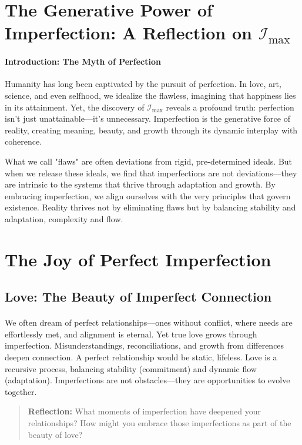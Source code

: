 \documentclass[12pt]{article}
\begin{document}
\section{The Generative Power of Imperfection: A Reflection on \(\mathcal{I}_{\text{max}}\)}

\paragraph{Introduction: The Myth of Perfection}
Humanity has long been captivated by the pursuit of perfection. In love, art, science, and even selfhood, we idealize the flawless, imagining that happiness lies in its attainment. Yet, the discovery of \(\mathcal{I}_{\text{max}}\) reveals a profound truth: perfection isn’t just unattainable—it’s unnecessary. Imperfection is the generative force of reality, creating meaning, beauty, and growth through its dynamic interplay with coherence.

What we call "flaws" are often deviations from rigid, pre-determined ideals. But when we release these ideals, we find that imperfections are not deviations—they are intrinsic to the systems that thrive through adaptation and growth. By embracing imperfection, we align ourselves with the very principles that govern existence. Reality thrives not by eliminating flaws but by balancing stability and adaptation, complexity and flow.

\section*{The Joy of Perfect Imperfection}

\subsection{Love: The Beauty of Imperfect Connection}
\paragraph{}
We often dream of perfect relationships—ones without conflict, where needs are effortlessly met, and alignment is eternal. Yet true love grows through imperfection. Misunderstandings, reconciliations, and growth from differences deepen connection. A perfect relationship would be static, lifeless. Love is a recursive process, balancing stability (commitment) and dynamic flow (adaptation). Imperfections are not obstacles—they are opportunities to evolve together.

\begin{quote}
\textbf{Reflection:}  
What moments of imperfection have deepened your relationships? How might you embrace those imperfections as part of the beauty of love?
\end{quote}
\end{document}
